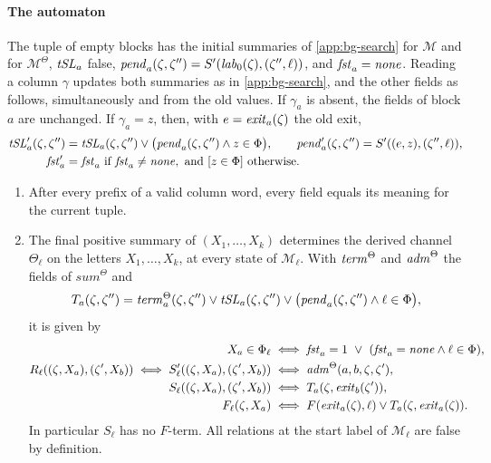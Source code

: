 \paragraph{The automaton}
The tuple of empty blocks has the initial summaries of \cref{app:bg-search}
for $\mathcal M$ and for $\mathcal M^\Theta$, $\mathit{tSL}_a$ false,
$\mathit{pend}_a(\zeta,\zeta'')=S'(\mathit{lab}_0(\zeta),(\zeta'',\ell))$, and
$\mathit{fst}_a=\mathit{none}$. Reading a column $\gamma$ updates both summaries as in
\cref{app:bg-search}, and the other fields as follows, simultaneously and from
the old values. If $\gamma_a$ is absent, the fields of block $a$ are unchanged.
If $\gamma_a=z$, then, with $e=\mathit{exit}_a(\zeta)$ the old exit,
\[
\begin{aligned}
 \mathit{tSL}'_a(\zeta,\zeta'')&=\mathit{tSL}_a(\zeta,\zeta'')\lor
   \bigl(\mathit{pend}_a(\zeta,\zeta'')\land z\in\Phi\bigr),\qquad
 \mathit{pend}'_a(\zeta,\zeta'')=S'((e,z),(\zeta'',\ell)),\\
 \mathit{fst}'_a&=\mathit{fst}_a\text{ if }\mathit{fst}_a\ne\mathit{none},\ \text{and }[z\in\Phi]\text{ otherwise}.
\end{aligned}
\]

\begin{lemma}\label{lem:mo-summary}
\leavevmode
\begin{enumerate}[leftmargin=*]
\item After every prefix of a valid column word, every field equals its meaning
  for the current tuple.
\item The final positive summary of $(X_1,\ldots,X_k)$ determines the derived
  channel $\Theta_\ell$ on the letters $X_1,\ldots,X_k$, at every state of
  $\mathcal M_\ell$. With $\mathit{term}^\Theta$ and $\mathit{adm}^\Theta$ the fields of
  $\mathit{sum}^\Theta$ and
  \[
   T_a(\zeta,\zeta'')=\mathit{term}^\Theta_a(\zeta,\zeta'')\lor\mathit{tSL}_a(\zeta,\zeta'')\lor
   \bigl(\mathit{pend}_a(\zeta,\zeta'')\land\ell\in\Phi\bigr),
  \]
  it is given by
  \[
  \begin{aligned}
   X_a\in\Phi_\ell&\iff\ffst_a=1\ \lor\ (\ffst_a=\mathit{none}\land\ell\in\Phi),\\
   R_\ell((\zeta,X_a),(\zeta',X_b))\iff S'_\ell((\zeta,X_a),(\zeta',X_b))
     &\iff\fadm^\Theta(a,b,\zeta,\zeta'),\\
   S_\ell((\zeta,X_a),(\zeta',X_b))&\iff T_a(\zeta,\fexit_b(\zeta')),\\
   F_\ell(\zeta,X_a)&\iff F(\fexit_a(\zeta),\ell)\lor
     T_a(\zeta,\fexit_a(\zeta)).
  \end{aligned}
  \]
  In particular $S_\ell$ has no $F$-term. All relations at the start label of
  $\mathcal M_\ell$ are false by definition.
\end{enumerate}
\end{lemma}

